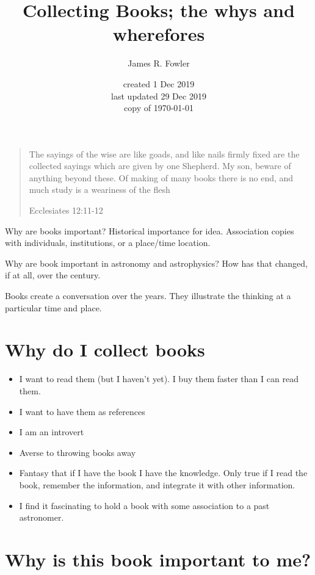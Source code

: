 \documentclass[letterpaper]{article}
\begin{document}
\title{Collecting Books; the whys and wherefores}
\author{James R. Fowler}
\date{created 1 Dec 2019\\ last updated 29 Dec 2019\\ copy of \today}

\maketitle

\begin{quotation}
  The sayings of the wise are like goads, and like nails firmly fixed
  are the collected sayings which are given by one Shepherd.  My son,
  beware of anything beyond these. Of making of many books there is no
  end, and much study is a weariness of the flesh

  Ecclesiates 12:11-12
\end{quotation}

Why are books important? Historical importance for idea. Association
copies with individuals, institutions, or a place/time location.

Why are book important in  astronomy and astrophysics? How
has that changed, if at all, over the century.

Books create a conversation over the years. They illustrate the thinking
at a particular time and place.

\section{Why do I collect books}

\begin{itemize}
\item I want to read them (but I haven't yet). I buy them faster than
  I can read them.
\item I want to have them as references
\item I am an introvert
\item Averse to throwing books away
\item Fantasy that if I have the book I have the knowledge. Only true
  if I read the book, remember the information, and integrate it with
  other information.
\item I find it fascinating to hold a book with some association
  to a past astronomer.
\end{itemize}


\section{Why is this book important to me?}
\end{document}
